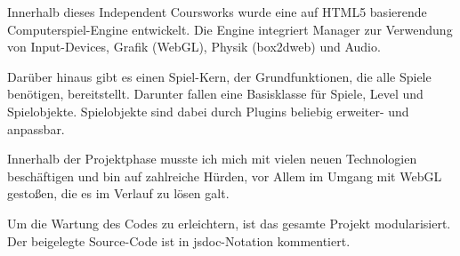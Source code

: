 
Innerhalb dieses Independent Coursworks wurde eine auf HTML5 basierende Computerspiel-Engine entwickelt. Die Engine integriert Manager zur Verwendung von Input-Devices, Grafik (WebGL), Physik (box2dweb) und Audio.

Darüber hinaus gibt es einen Spiel-Kern, der Grundfunktionen, die alle Spiele benötigen, bereitstellt. Darunter fallen eine Basisklasse für Spiele, Level und Spielobjekte. Spielobjekte sind dabei durch Plugins beliebig erweiter- und anpassbar.

Innerhalb der Projektphase musste ich mich mit vielen neuen Technologien beschäftigen und bin auf zahlreiche Hürden, vor Allem im Umgang mit WebGL gestoßen, die es im Verlauf zu lösen galt.

Um die Wartung des Codes zu erleichtern, ist das gesamte Projekt modularisiert. Der beigelegte Source-Code ist in jsdoc-Notation kommentiert.